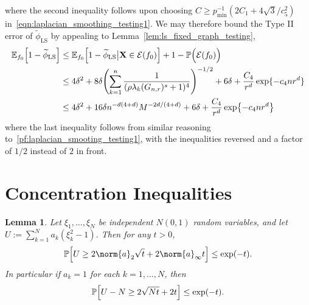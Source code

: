 \documentclass{article}
\newcommand{\1}{\mathbf{1}}
\newcommand{\mc}[1]{\mathcal{#1}}
\newcommand{\Pbb}{\mathbb{P}}
\newcommand{\Ebb}{\mathbb{E}}
\newcommand{\wt}[1]{\widetilde{#1}}
\newcommand{\LS}{\mathrm{LS}}
\theoremstyle{alden}
\theoremstyle{aldenthm}
\newtheorem{lemma}{Lemma}
\theoremstyle{definition}
\theoremstyle{remark}
\begin{document}
where the second inequality follows upon choosing $C \geq p_{\min}^{-1}(2C_1 + 4\sqrt{3}/c_5^2)$ in~\eqref{eqn:laplacian_smoothing_testing1}. We may therefore bound the Type II error of $\wt{\phi}_{\LS}$ by appealing to Lemma~\ref{lem:ls_fixed_graph_testing},
\begin{align*}
\Ebb_{f_0}\Bigl[1 - \wt{\phi}_{\LS}\Bigr] & \leq \Ebb_{f_0}\Bigl[1 - \wt{\phi}_{\LS}\big| \mathbf{X} \in \mc{E}(f_0)\Bigr] + 1 - \Pbb\Bigl(\mc{E}(f_0)\Bigr) \\
& \leq 4 \delta^2 + 8 \delta \Biggl(\sum_{k = 1}^{n} \frac{1}{(\rho\lambda_k(G_{n,r})^s + 1)^4} \Biggr)^{-1/2} + 6\delta + \frac{C_4}{r^d}\exp\{-c_4nr^d\} \\
& \leq 4 \delta^2 + 16\delta n^{-d(4 + d)}M^{-2d/(4 + d)}  + 6\delta + \frac{C_4}{r^d}\exp\bigl\{-c_4nr^d\bigr\} 
\end{align*}
where the last inequality follows from similar reasoning to~\eqref{pf:laplacian_smooting_testing1}, with the inequalities reversed and a factor of $1/2$ instead of $2$ in front. 

\section{Concentration Inequalities}
\begin{lemma}
	\label{lem:chi_square_bound}
	Let $\xi_1,\ldots,\xi_N$ be independent $N(0,1)$ random variables, and let $U := \sum_{k = 1}^{N} a_k(\xi_k^2 - 1)$.  Then for any $t > 0$,
	\begin{equation*}
	\Pbb\Bigl[U \geq 2 \norm{a}_2 \sqrt{t} + 2 \norm{a}_{\infty}t\Bigr] \leq \exp(-t).
	\end{equation*}
	In particular if $a_k = 1$ for each $k = 1,\ldots,N$, then
	\begin{equation*}
	\Pbb\Bigl[U - N \geq 2\sqrt{N t} + 2t\Bigr] \leq \exp(-t).
	\end{equation*}
\end{lemma}


 
\end{document}
